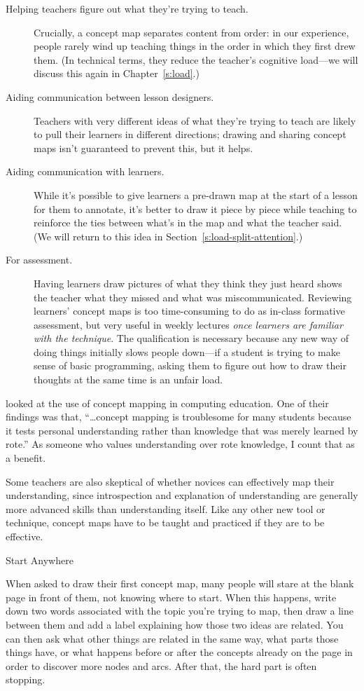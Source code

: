 \begin{description}
\item[Helping teachers figure out what they're trying to teach.]
Crucially, a concept map separates content from order: in our
experience, people rarely wind up teaching things in the order in
which they first drew them. (In technical terms, they reduce the
teacher's cognitive load---we will discuss this again in
Chapter~\ref{s:load}.)
\item[Aiding communication between lesson designers.]
Teachers with very different ideas of what they're trying to teach
are likely to pull their learners in different directions; drawing
and sharing concept maps isn't guaranteed to prevent this, but it
helps.
\item[Aiding communication with learners.]
While it's possible to give learners a pre-drawn map at the start of
a lesson for them to annotate, it's better to draw it piece by piece
while teaching to reinforce the ties between what's in the map and
what the teacher said. (We will return to this idea in
Section~\ref{s:load-split-attention}.)
\item[For assessment.]
Having learners draw pictures of what they think they just heard
shows the teacher what they missed and what was miscommunicated.
Reviewing learners' concept maps is too time-consuming to do as
in-class formative assessment, but very useful in weekly lectures
\emph{once learners are familiar with the technique}. The qualification
is necessary because any new way of doing things initially slows
people down---if a student is trying to make sense of basic
programming, asking them to figure out how to draw their thoughts at
the same time is an unfair load.
\end{description}

\cite{Kepp2008} looked at the use of concept mapping in computing
education. One of their findings was that, ``{\ldots}concept
mapping is troublesome for many students because it tests personal
understanding rather than knowledge that was merely learned by rote.'' As
someone who values understanding over rote knowledge, I count that as a
benefit.

Some teachers are also skeptical of whether novices can effectively map
their understanding, since introspection and explanation of
understanding are generally more advanced skills than understanding
itself. Like any other new tool or technique, concept maps have to be
taught and practiced if they are to be effective.

\begin{aside}{Start Anywhere}

When asked to draw their first concept map, many people will stare at
the blank page in front of them, not knowing where to start. When this
happens, write down two words associated with the topic you're trying
to map, then draw a line between them and add a label explaining how
those two ideas are related. You can then ask what other things are
related in the same way, what parts those things have, or what happens
before or after the concepts already on the page in order to discover
more nodes and arcs. After that, the hard part is often stopping.

\end{aside}

